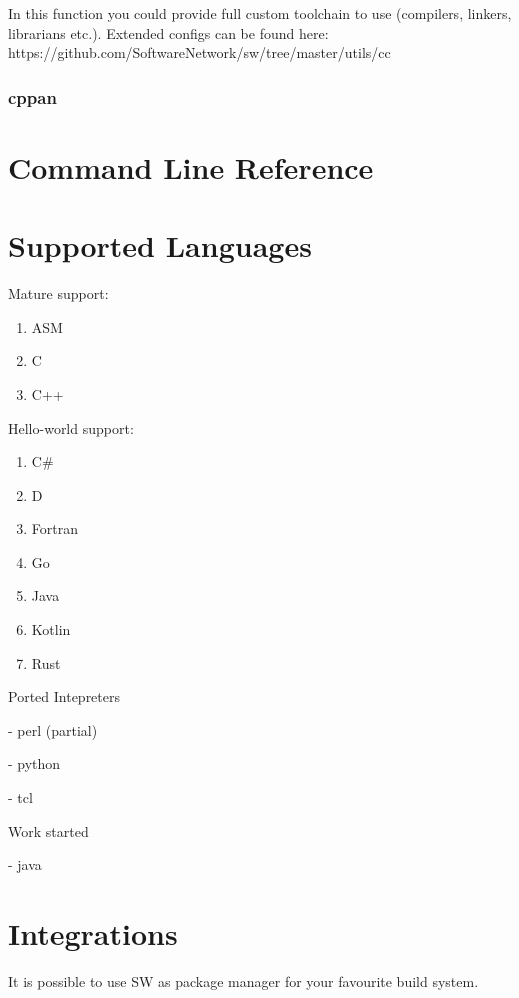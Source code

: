 In this function you could provide full custom toolchain to use (compilers, linkers, librarians etc.).
Extended configs can be found here: https://github.com/SoftwareNetwork/sw/tree/master/utils/cc


\subsubsection{cppan}








\section{Command Line Reference}




\section{Supported Languages}

Mature support:
\begin{enumerate}
\item ASM
\item C
\item C++
\end{enumerate}

Hello-world support:
\begin{enumerate}
\item C\#
\item D
\item Fortran
\item Go
\item Java
\item Kotlin
\item Rust
\end{enumerate}


Ported Intepreters

- perl (partial)

- python

- tcl

Work started

- java


\section{Integrations}

It is possible to use SW as package manager for your favourite build system.

